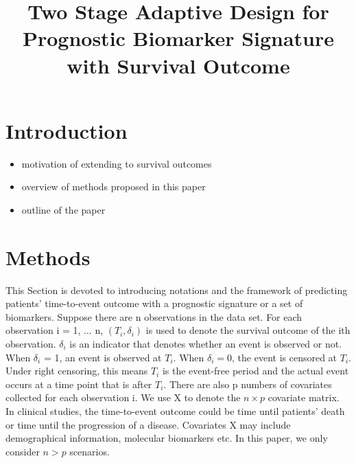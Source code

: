 \documentclass[11pt]{article}
\title{Two Stage Adaptive Design for Prognostic Biomarker Signature with Survival Outcome}
\begin{document}
\maketitle


\section{Introduction}
	
	\begin{itemize}	
		\item motivation of extending to survival outcomes
		\item overview of methods proposed in this paper
		\item outline of the paper
	\end{itemize}


\section{Methods}	

	\par This Section is devoted to introducing notations and the framework of predicting patients' time-to-event outcome with a prognostic signature or a set of biomarkers. Suppose there are n observations in the data set. For each observation i = 1, ... n, $(T_{i}, \delta_{i})$ is used to denote the survival outcome of the ith observation. $\delta_{i}$ is an indicator that denotes whether an event is observed or not. When $\delta_{i}$ = 1, an event is observed at $T_{i}$. When $\delta_{i} = 0$, the event is censored at $T_{i}$. Under right censoring, this means $T_{i}$ is the event-free period and the actual event occurs at a time point that is after $T_{i}$. There are also p numbers of covariates collected for each observation i. We use X to denote the $n\times p$ covariate matrix. In clinical studies, the time-to-event outcome could be time until patients' death or time until the progression of a disease. Covariates X may include demographical information, molecular biomarkers etc. In this paper, we only consider $n > p$ scenarios.  
	
\end{document}
